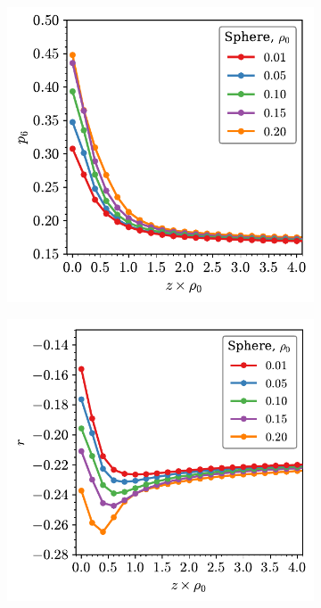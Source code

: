\begin{figure}

	\begin{subfigure}[b]{0.46\textwidth}
         \centering
         \includegraphics[width=\textwidth]{./figures/quasi2d/p6_z_3d_sphere.pdf}
         \caption{}
         \label{fig:pra}
     \end{subfigure}
     \hfill
     \begin{subfigure}[b]{0.48\textwidth}
         \centering
         \includegraphics[width=\textwidth]{./figures/quasi2d/r_z_3d_sphere.pdf}
         \caption{}
         \label{fig:prb}
     \end{subfigure}
     \hfill
     

\end{figure}

